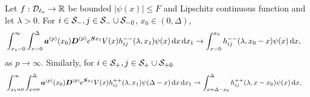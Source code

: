
\begin{lem}\label{lem: ppp}
	Let \(f:\mathcal{D}_{\ell_0}\to \mathbb R\) be bounded \(|\psi(x)|\leq F\) and Lipschitz continuous function and let \(\lambda >0\). For \(i\in\mathcal S_-,j\in\mathcal S_-\cup\mathcal{S}_{-0}\), \(x_0\in(0,\Delta)\), 
	\begin{align}
		&\int_{x_1=0}^\infty \int_{x=0}^{\Delta}\boldsymbol a^{(p)}(x_0) \boldsymbol D^{(p)} e^{\boldsymbol S x_1} V(x) h_{ij}^{--}(\lambda, x_1) \psi(x) \, \mathrm{d} x \, \mathrm{d} x_1  
		\to \int_{x=0}^{x_0} h_{ij}^{--}(\lambda,x_0-x)\psi(x)\, \mathrm{d} x, \label{eqn: LLLlllL}
	\end{align}
	as \(p\to\infty\). Similarly, for \(i\in\mathcal S_+,j\in\mathcal S_+\cup\mathcal{S}_{+0}\)
	\begin{align}
		&\int_{x_1=0}^\infty \int_{x=0}^{\Delta}\boldsymbol a^{(p)}(x_0) \boldsymbol D^{(p)} e^{\boldsymbol S x_1} V(x) h_{ij}^{++}(\lambda, x_1) \psi(\Delta-x) \, \mathrm{d} x \, \mathrm{d} x_1  
		\to\int_{x=\Delta-x_0}^{\Delta} h_{ij}^{++}(\lambda,x-x_0)\psi(x)\, \mathrm{d} x, \label{eqn: LLLlllL2222}
	\end{align}
\end{lem}
